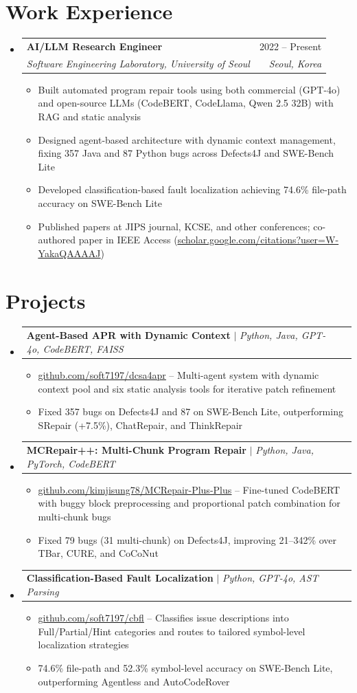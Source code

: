 \documentclass[letterpaper,11pt]{article}
\makeatletter
\newcommand{\resumeItem}[1]{
  \item\small{
    {#1 \vspace{-2pt}}
  }
}
\newcommand{\resumeSubheading}[4]{
  \vspace{-2pt}\item
    \begin{tabular*}{0.97\textwidth}[t]{l@{\extracolsep{\fill}}r}
      \textbf{#1} & #2 \\
      \textit{\small#3} & \textit{\small #4} \\
    \end{tabular*}\vspace{-7pt}
}
\newcommand{\resumeProjectHeading}[2]{
    \item
    \begin{tabular*}{0.97\textwidth}{l@{\extracolsep{\fill}}r}
      \small#1 & #2 \\
    \end{tabular*}\vspace{-7pt}
}
\newcommand{\resumeSubHeadingListStart}{\begin{itemize}[leftmargin=0.15in, label={}]}
\newcommand{\resumeSubHeadingListEnd}{\end{itemize}}
\newcommand{\resumeItemListStart}{\begin{itemize}}
\newcommand{\resumeItemListEnd}{\end{itemize}\vspace{-5pt}}
\makeatother
\begin{document}
\section{Work Experience}
  \resumeSubHeadingListStart

    \resumeSubheading
      {AI/LLM Research Engineer}{2022 -- Present}
      {Software Engineering Laboratory, University of Seoul}{Seoul, Korea}
      \resumeItemListStart
        \resumeItem{Built automated program repair tools using both commercial (GPT-4o) and open-source LLMs (CodeBERT, CodeLlama, Qwen 2.5 32B) with RAG and static analysis}
        \resumeItem{Designed agent-based architecture with dynamic context management, fixing 357 Java and 87 Python bugs across Defects4J and SWE-Bench Lite}
        \resumeItem{Developed classification-based fault localization achieving 74.6\% file-path accuracy on SWE-Bench Lite}
        \resumeItem{Published papers at JIPS journal, KCSE, and other conferences; co-authored paper in IEEE Access (\href{https://scholar.google.com/citations?hl=en&user=W-YakaQAAAAJ&view_op=list_works&sortby=pubdate}{\underline{scholar.google.com/citations?user=W-YakaQAAAAJ}})}
      \resumeItemListEnd

  \resumeSubHeadingListEnd


\section{Projects}
    \resumeSubHeadingListStart
      \resumeProjectHeading
          {\textbf{Agent-Based APR with Dynamic Context} $|$ \emph{Python, Java, GPT-4o, CodeBERT, FAISS}}{}
          \resumeItemListStart
            \resumeItem{\href{https://github.com/soft7197/dcsa4apr}{\underline{github.com/soft7197/dcsa4apr}} -- Multi-agent system with dynamic context pool and six static analysis tools for iterative patch refinement}
            \resumeItem{Fixed 357 bugs on Defects4J and 87 on SWE-Bench Lite, outperforming SRepair (+7.5\%), ChatRepair, and ThinkRepair}
          \resumeItemListEnd
      \resumeProjectHeading
          {\textbf{MCRepair++: Multi-Chunk Program Repair} $|$ \emph{Python, Java, PyTorch, CodeBERT}}{}
          \resumeItemListStart
            \resumeItem{\href{https://github.com/kimjisung78/MCRepair-Plus-Plus}{\underline{github.com/kimjisung78/MCRepair-Plus-Plus}} -- Fine-tuned CodeBERT with buggy block preprocessing and proportional patch combination for multi-chunk bugs}
            \resumeItem{Fixed 79 bugs (31 multi-chunk) on Defects4J, improving 21--342\% over TBar, CURE, and CoCoNut}
          \resumeItemListEnd
      \resumeProjectHeading
          {\textbf{Classification-Based Fault Localization} $|$ \emph{Python, GPT-4o, AST Parsing}}{}
          \resumeItemListStart
            \resumeItem{\href{https://github.com/soft7197/cbfl}{\underline{github.com/soft7197/cbfl}} -- Classifies issue descriptions into Full/Partial/Hint categories and routes to tailored symbol-level localization strategies}
            \resumeItem{74.6\% file-path and 52.3\% symbol-level accuracy on SWE-Bench Lite, outperforming Agentless and AutoCodeRover}
          \resumeItemListEnd
    \resumeSubHeadingListEnd
\end{document}
